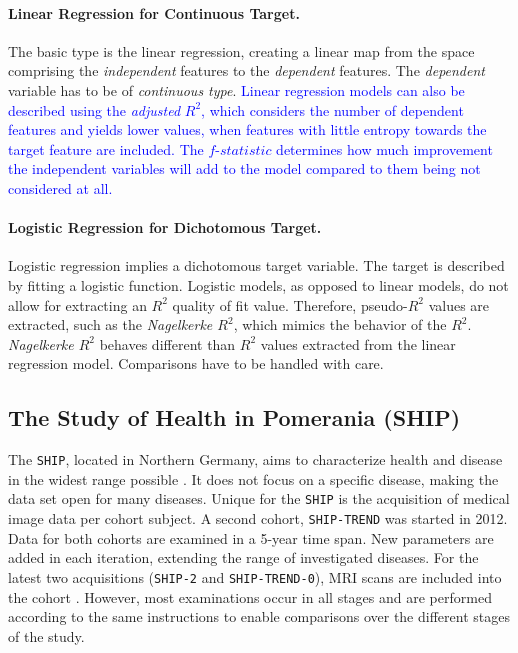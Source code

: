 \documentclass[journal]{style/vgtc} 			          %
\newcommand{\add}[1]{\textcolor{blue}{#1}}
\begin{document}
\paragraph{Linear Regression for Continuous Target.} The basic type is the linear regression, creating a linear map from the space comprising the \emph{independent} features to the \emph{dependent} features.
The \emph{dependent} variable has to be of \emph{continuous type}.
\add{
Linear regression models can also be described using the \emph{adjusted} $R^2$, which considers the number of dependent features and yields lower values, when features with little entropy towards the target feature are included.
The $f$-$statistic$ determines how much improvement the independent variables will add to the model compared to them being not considered at all.
}

\paragraph{Logistic Regression for Dichotomous Target.} Logistic regression implies a dichotomous target variable.
The target is described by fitting a logistic function.
Logistic models, as opposed to linear models, do not allow for extracting an $R^2$ quality of fit value.
Therefore, pseudo-$R^2$ values are extracted, such as the \emph{Nagelkerke $R^2$}, which mimics the behavior of the $R^2$.
\emph{Nagelkerke $R^2$} behaves different than $R^2$ values extracted from the linear regression model.
Comparisons have to be handled with care.
\subsection{The Study of Health in Pomerania (SHIP)}
The \texttt{SHIP}, located in Northern Germany, aims to characterize health and disease in the widest range possible \cite{Volzke2011}.
It does not focus on a specific disease, making the data set open for many diseases.
Unique for the \texttt{SHIP} is the acquisition of medical image data per cohort subject.
A second cohort, \texttt{SHIP-TREND} was started in 2012.
Data for both cohorts are examined in a 5-year time span.
New parameters are added in each iteration, extending the range of investigated diseases.
For the latest two acquisitions (\texttt{SHIP-2} and \texttt{SHIP-TREND-0}), MRI scans are included into the cohort \cite{Hegenscheid2009, Ivanovska2014}.
However, most examinations occur in all stages and are performed according to the same instructions to enable comparisons over the different stages of the study.
\end{document}
